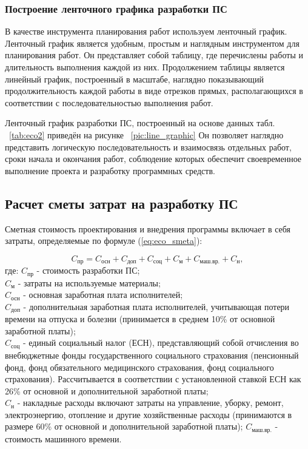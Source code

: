 \subsubsection*{Построение ленточного графика разработки ПС}
В качестве инструмента планирования работ используем ленточный график. Ленточный график является удобным, простым и наглядным
инструментом для планирования работ. Он представляет собой таблицу, где перечислены  работы и длительность выполнения каждой
из них. Продолжением таблицы является линейный график, построенный в масштабе, наглядно показывающий продолжительность
каждой работы в виде отрезков прямых,  располагающихся в соответствии с последовательностью выполнения работ.

Ленточный график разработки ПС, построенный на основе данных табл. ~\ref{tab:eco2} приведён на рисунке ~\ref{pic:line_graphic} 
Он позволяет наглядно представить логическую последовательность и взаимосвязь отдельных работ, сроки начала и окончания работ,
соблюдение которых обеспечит своевременное выполнение проекта и разработку программных средств.


\subsection{Расчет сметы затрат на  разработку ПС}
Сметная стоимость проектирования и внедрения программы включает в себя  затраты, определяемые по формуле (\ref{eq:eco_smeta}):

\begin{equation}
C_{\mbox{пр}} = C_{\mbox{осн}} + C_{\mbox{доп}} + C_{\mbox{соц}} + C_{\mbox{м}} + C_{\mbox{маш.вр.}} + C_{\mbox{н}},
\label{eq:eco_smeta}
\end{equation}
где:	${C_{\mbox{пр}}}$ - стоимость разработки ПС; \\
	${C_{\mbox{м}}}$ - затраты на используемые материалы; \\
	${C_{\mbox{осн}}}$ - основная заработная плата исполнителей; \\
	${C_{\mbox{доп}}}$ - дополнительная заработная плата исполнителей, учитывающая потери времени на отпуска и болезни
		(принимается в среднем 10\% от основной заработной платы); \\
	${C_{\mbox{соц}}}$ - единый социальный налог (ЕСН), представляющий собой отчисления во внебюджетные фонды
		государственного социального страхования (пенсионный фонд, фонд обязательного медицинского страхования,
		фонд социального страхования). Рассчитывается в соответствии с установленной ставкой ЕСН как 26\% от
		основной и дополнительной заработной платы; \\
	${C_{\mbox{н}}}$ - накладные расходы включают затраты на управление, уборку, ремонт, электроэнергию, отопление и
		другие хозяйственные расходы (принимаются в размере 60\% от основной и дополнительной заработной платы);
	${C_{\mbox{маш.вр.}}}$ - стоимость машинного времени. \\

